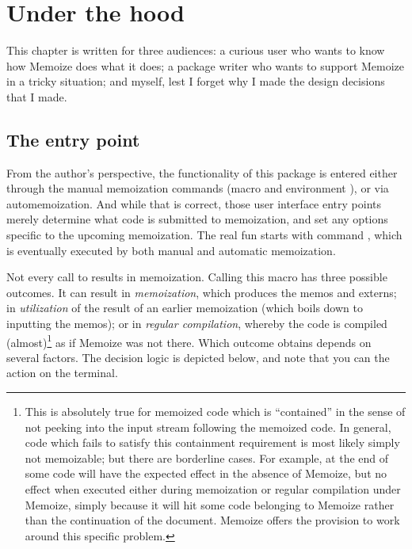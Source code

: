 \documentclass[a4paper,11pt]{article}
\begin{document}
\section{Under the hood}
\label{sec:under-the-hood}

This chapter is written for three audiences: a curious user who wants to
know how Memoize does what it does; a package writer who wants to support
Memoize in a tricky situation; and myself, lest I forget why I made the design
decisions that I made.

\subsection{The entry point}
\label{sec:Memoize}


From the author's perspective, the functionality of this package is entered
either through the manual memoization commands (macro  and
environment ), or via automemoization.  And while that is
correct, those user interface entry points merely determine what code is
submitted to memoization, and set any options specific to the upcoming
memoization.  The real fun starts with command , which
is eventually executed by both manual and automatic memoization.

Not every call to  results in memoization.  Calling this macro
has three possible outcomes.  It can result in \emph{memoization}, which
produces the memos and externs; in \emph{utilization} of the result of an
earlier memoization (which boils down to inputting the memos); or in
\emph{regular compilation}, whereby the code is compiled
(almost)\footnote{\label{fn:regular-compilation-almost}This is absolutely true
  for memoized code which is ``contained'' in the sense of not peeking into the
  input stream following the memoized code.  In general, code which fails to
  satisfy this containment requirement is most likely simply not memoizable;
  but there are borderline cases.  For example,  at the
  end of some code will have the expected effect in the absence of Memoize, but
  no effect when executed either during memoization or regular compilation
  under Memoize, simply because it will hit some code belonging to Memoize
  rather than the continuation of the document.  Memoize offers the
   provision to work around this specific problem.} as if
Memoize was not there.  Which outcome obtains depends on several factors.  The
decision logic is depicted below, and note that you can  the
action on the terminal.
\end{document}
